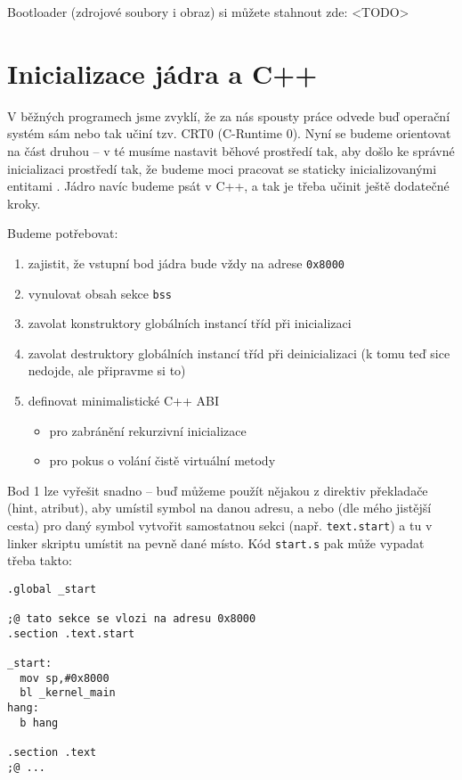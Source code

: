 \documentclass{article}
\begin{document}
Bootloader (zdrojové soubory i obraz) si můžete stahnout zde: <TODO>

\section{Inicializace jádra a C++}

V běžných programech jsme zvyklí, že za nás spousty práce odvede buď operační systém sám nebo tak učiní tzv. CRT0 (C-Runtime 0). Nyní se budeme orientovat na část druhou -- v té musíme nastavit běhové prostředí tak, aby došlo ke správné inicializaci prostředí tak, že budeme moci pracovat se staticky inicializovanými entitami . Jádro navíc budeme psát v C++, a tak je třeba učinit ještě dodatečné kroky.

Budeme potřebovat:
\begin{enumerate}
	\item zajistit, že vstupní bod jádra bude vždy na adrese \texttt{0x8000}
	\item vynulovat obsah sekce \texttt{bss}
	\item zavolat konstruktory globálních instancí tříd při inicializaci
	\item zavolat destruktory globálních instancí tříd při deinicializaci (k tomu teď sice nedojde, ale připravme si to)
	\item definovat minimalistické C++ ABI
		\begin{itemize}
			\item pro zabránění rekurzivní inicializace
			\item pro pokus o volání čistě virtuální metody
		\end{itemize}
\end{enumerate}

Bod 1 lze vyřešit snadno -- buď můžeme použít nějakou z direktiv překladače (hint, atribut), aby umístil symbol na danou adresu, a nebo (dle mého jistější cesta) pro daný symbol vytvořit samostatnou sekci (např. \texttt{text.start}) a tu v linker skriptu umístit na pevně dané místo. Kód \texttt{start.s} pak může vypadat třeba takto:

\begin{lstlisting}
.global _start

;@ tato sekce se vlozi na adresu 0x8000
.section .text.start

_start:
  mov sp,#0x8000
  bl _kernel_main
hang:
  b hang

.section .text
;@ ...

\end{lstlisting}
\end{document}
